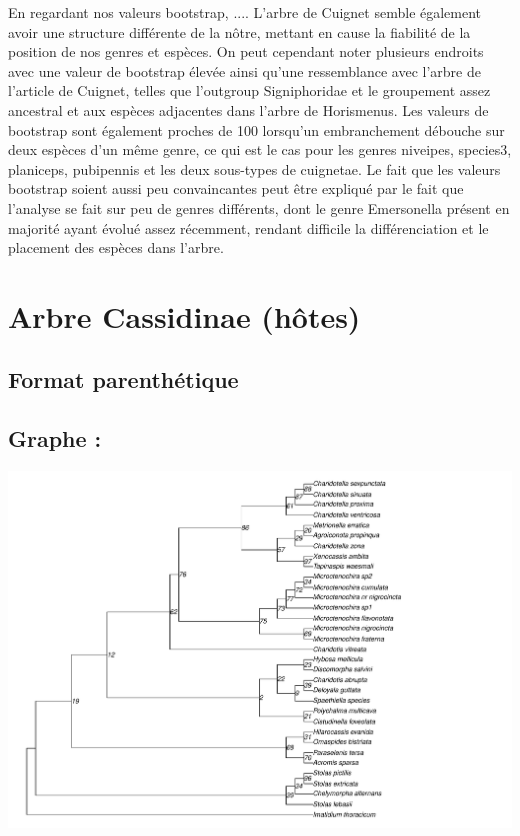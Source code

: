 \documentclass[a4paper, 11pt]{article}
\begin{document}
En regardant nos valeurs bootstrap, .... L’arbre de Cuignet semble également avoir une structure différente de la nôtre, mettant en cause la fiabilité de la position de nos genres et espèces. On peut cependant noter plusieurs endroits avec une valeur de bootstrap élevée ainsi qu’une ressemblance avec l’arbre de l’article de Cuignet, telles que l’outgroup Signiphoridae et le groupement assez ancestral et aux espèces adjacentes dans l’arbre de Horismenus. Les valeurs de bootstrap sont également proches de 100 lorsqu’un embranchement débouche sur deux espèces d’un même genre, ce qui est le cas pour les genres niveipes, species3, planiceps, pubipennis et les deux sous-types de cuignetae.
Le fait que les valeurs bootstrap soient aussi peu convaincantes peut être expliqué par le fait que l’analyse se fait sur peu de genres différents, dont le genre Emersonella présent en majorité ayant évolué assez récemment, rendant difficile la différenciation et le placement des espèces dans l’arbre.

\section{Arbre Cassidinae (hôtes)}
\subsection{Format parenthétique} 


\subsection{Graphe :}
\includegraphics[width = 1\textwidth]{plot_Cassidinae_28S_D2_PhyML_GTR.pdf}
\end{document}

